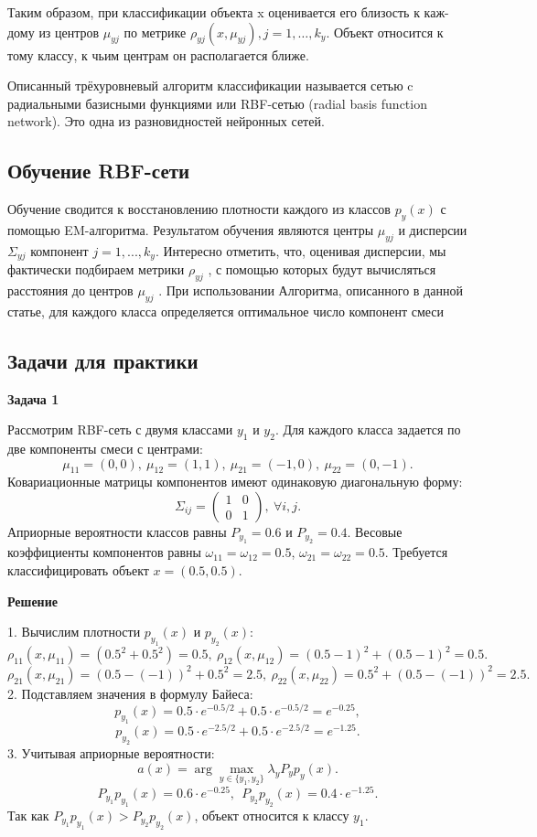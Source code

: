 Таким образом, при классификации объекта x оценивается его близость к каж- дому из центров $\mu _{yj}$ по метрике $\rho _{yj}(x, \mu _{yj}), j = 1, \dots, k_y$. Объект относится к тому классу, к чьим центрам он располагается ближе.

Описанный трёхуровневый алгоритм классификации называется сетью c радиальными базисными функциями или RBF-сетью (radial basis function network). Это одна из разновидностей нейронных сетей.

\subsection*{Обучение RBF-сети}

Обучение сводится к восстановлению плотности каждого из классов $p_y(x)$ с помощью EM-алгоритма. Результатом обучения являются центры $\mu _{yj}$ и дисперсии $\Sigma _{yj}$ компонент $j = 1, . . . , k_y$. Интересно отметить, что, оценивая дисперсии, мы фактически подбираем метрики $\rho _{yj}$ , с помощью которых будут вычисляться расстояния до центров $\mu _{yj}$ . При использовании Алгоритма, описанного в данной статье, для каждого класса определяется оптимальное число компонент смеси


\subsection*{Задачи для практики}

\textbf{Задача 1}  

Рассмотрим RBF-сеть с двумя классами $ y_1 $ и $ y_2 $. Для каждого класса задается по две компоненты смеси с центрами:
\[
\mu_{11} = (0, 0), \ \mu_{12} = (1, 1), \ \mu_{21} = (-1, 0), \ \mu_{22} = (0, -1).
\]
Ковариационные матрицы компонентов имеют одинаковую диагональную форму:
\[
\Sigma_{ij} = \begin{pmatrix} 1 & 0 \\
0 & 1 \end{pmatrix}, \ \forall i, j.
\]
Априорные вероятности классов равны $ P_{y_1} = 0.6 $ и $ P_{y_2} = 0.4 $. Весовые коэффициенты компонентов равны $ \omega_{11} = \omega_{12} = 0.5 $, $ \omega_{21} = \omega_{22} = 0.5 $. Требуется классифицировать объект $ x = (0.5, 0.5) $.

\textbf{Решение}  

1. Вычислим плотности $ p_{y_1}(x) $ и $ p_{y_2}(x) $:
\[
\rho_{11}(x, \mu_{11}) = (0.5^2 + 0.5^2) = 0.5, \ \rho_{12}(x, \mu_{12}) = (0.5 - 1)^2 + (0.5 - 1)^2 = 0.5.
\]
\[
\rho_{21}(x, \mu_{21}) = (0.5 - (-1))^2 + 0.5^2 = 2.5, \ \rho_{22}(x, \mu_{22}) = 0.5^2 + (0.5 - (-1))^2 = 2.5.
\]
2. Подставляем значения в формулу Байеса:
\[
p_{y_1}(x) = 0.5 \cdot e^{-0.5/2} + 0.5 \cdot e^{-0.5/2} = e^{-0.25},
\]
\[
p_{y_2}(x) = 0.5 \cdot e^{-2.5/2} + 0.5 \cdot e^{-2.5/2} = e^{-1.25}.
\]
3. Учитывая априорные вероятности:
\[
a(x) = \arg\max_{y \in \{y_1, y_2\}} \lambda_y P_y p_y(x).
\]
\[
P_{y_1} p_{y_1}(x) = 0.6 \cdot e^{-0.25}, \ \ P_{y_2} p_{y_2}(x) = 0.4 \cdot e^{-1.25}.
\]
Так как $ P_{y_1} p_{y_1}(x) > P_{y_2} p_{y_2}(x) $, объект относится к классу $ y_1 $.

